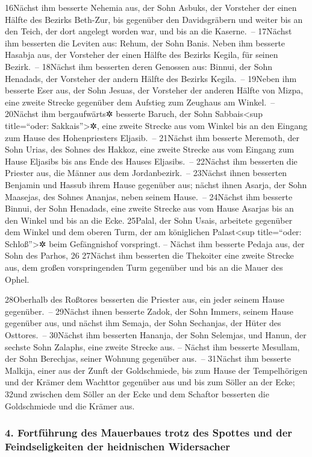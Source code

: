16Nächst ihm besserte Nehemia aus, der Sohn Asbuks, der Vorsteher der
einen Hälfte des Bezirks Beth-Zur, bis gegenüber den Davidsgräbern und
weiter bis an den Teich, der dort angelegt worden war, und bis an die
Kaserne.~-- 17Nächst ihm besserten die Leviten aus: Rehum, der Sohn
Banis. Neben ihm besserte Hasabja aus, der Vorsteher der einen Hälfte
des Bezirks Kegila, für seinen Bezirk.~-- 18Nächst ihm besserten deren
Genossen aus: Binnui, der Sohn Henadads, der Vorsteher der andern Hälfte
des Bezirks Kegila.~-- 19Neben ihm besserte Eser aus, der Sohn Jesuas,
der Vorsteher der anderen Hälfte von Mizpa, eine zweite Strecke
gegenüber dem Aufstieg zum Zeughaus am Winkel.~-- 20Nächst ihm
bergaufwärts✲ besserte Baruch, der Sohn Sabbais\textless sup
title=``oder: Sakkais''\textgreater✲, eine zweite Strecke aus vom Winkel
bis an den Eingang zum Hause des Hohenpriesters Eljasib.~-- 21Nächst ihm
besserte Meremoth, der Sohn Urias, des Sohnes des Hakkoz, eine zweite
Strecke aus vom Eingang zum Hause Eljasibs bis ans Ende des Hauses
Eljasibs.~-- 22Nächst ihm besserten die Priester aus, die Männer aus dem
Jordanbezirk.~-- 23Nächst ihnen besserten Benjamin und Hassub ihrem
Hause gegenüber aus; nächst ihnen Asarja, der Sohn Maasejas, des Sohnes
Ananjas, neben seinem Hause.~-- 24Nächst ihm besserte Binnui, der Sohn
Henadads, eine zweite Strecke aus vom Hause Asarjas bis an den Winkel
und bis an die Ecke. 25Palal, der Sohn Usais, arbeitete gegenüber dem
Winkel und dem oberen Turm, der am königlichen Palast\textless sup
title=``oder: Schloß''\textgreater✲ beim Gefängnishof vorspringt. --
Nächst ihm besserte Pedaja aus, der Sohn des Parhos, 26 27Nächst ihm
besserten die Thekoiter eine zweite Strecke aus, dem großen
vorspringenden Turm gegenüber und bis an die Mauer des Ophel.

28Oberhalb des Roßtores besserten die Priester aus, ein jeder seinem
Hause gegenüber.~-- 29Nächst ihnen besserte Zadok, der Sohn Immers,
seinem Hause gegenüber aus, und nächst ihm Semaja, der Sohn Sechanjas,
der Hüter des Osttores.~-- 30Nächst ihm besserten Hananja, der Sohn
Selemjas, und Hanun, der sechste Sohn Zalaphs, eine zweite Strecke aus.
-- Nächst ihm besserte Mesullam, der Sohn Berechjas, seiner Wohnung
gegenüber aus.~-- 31Nächst ihm besserte Malkija, einer aus der Zunft der
Goldschmiede, bis zum Hause der Tempelhörigen und der Krämer dem
Wachttor gegenüber aus und bis zum Söller an der Ecke; 32und zwischen
dem Söller an der Ecke und dem Schaftor besserten die Goldschmiede und
die Krämer aus.

\hypertarget{fortfuxfchrung-des-mauerbaues-trotz-des-spottes-und-der-feindseligkeiten-der-heidnischen-widersacher}{%
\subsubsection{4. Fortführung des Mauerbaues trotz des Spottes und der
Feindseligkeiten der heidnischen
Widersacher}\label{fortfuxfchrung-des-mauerbaues-trotz-des-spottes-und-der-feindseligkeiten-der-heidnischen-widersacher}}

